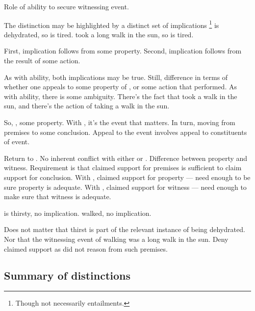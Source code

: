 \begin{note}
  Role of ability to secure witnessing event.

  The distinction may be highlighted by a distinct set of implications\nolinebreak
  \footnote{
    Though not necessarily entailments.
  }
   is dehydrated, so  is tired.
   took a long walk in the sun, so  is tired.

  First, implication follows from some property.
  Second, implication follows from the result of some action.

  As with ability, both implications may be true.
  Still, difference in terms of whether one appeals to some property of , or some action that  performed.
  As with ability, there is some ambiguity.
  There's the fact that  took a walk in the sun, and there's the action of  taking a walk in the sun.
\end{note}

\begin{note}[Why]
  So, \AR{}, some property.
  With \WR{}, it's the event that matters.
  In turn, moving from premises to some conclusion.
  Appeal to the event involves appeal to constituents of event.

  Return to \ESU{}.
  No inherent conflict with either \AR{} or \WR{}.
  Difference between property and witness.
  Requirement is that claimed support for premises is sufficient to claim support for conclusion.
  With \AR{}, claimed support for property --- need enough to be sure property is adequate.
  With \WR{}, claimed support for witness --- need enough to make sure that witness is adequate.

   is thirsty, no implication.
   walked, no implication.

  Does not matter that thirst is part of the relevant instance of being dehydrated.
  Nor that the witnessing event of walking was a long walk in the sun.
  Deny claimed support as did not reason from such premises.
\end{note}

\subsection{Summary of distinctions}
\label{sec:summary-distinctions}

\begin{note}
  \begin{figure}[H]
    \centering
    \saMtxInterpreted{}
  \end{figure}
\end{note}

